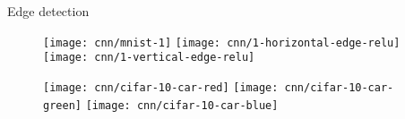 \documentclass{beamer}
\begin{document}
\begin{frame}{Edge detection}


\begin{figure}
	\texttt{[image: cnn/mnist-1]}
	\hfill
	\texttt{[image: cnn/1-horizontal-edge-relu]}
	\hfill
	\texttt{[image: cnn/1-vertical-edge-relu]}
\end{figure}

\end{frame}

\begin{frame}

\begin{figure}
	\texttt{[image: cnn/cifar-10-car-red]}
	\hfill
	\texttt{[image: cnn/cifar-10-car-green]}
	\hfill
	\texttt{[image: cnn/cifar-10-car-blue]}
\end{figure}

\end{frame}
\end{document}
